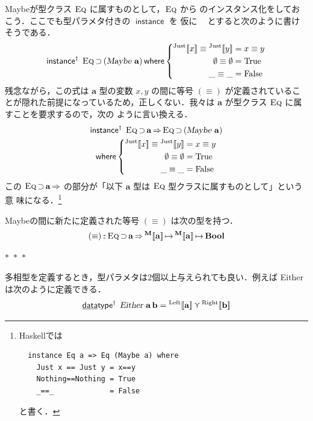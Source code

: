 \documentclass[a5paper,twoside,fleqn,draft]{jsbook}
\def\[{[\![}
\def\]{]\!]}
\newcommand{\separator}{\begin{center}$*$~$*$~$*$\end{center}}
\newcommand{\programminglanguage}[1]{\textsf{#1}}
\newcommand{\haskell}{\programminglanguage{Haskell}}
\newcommand{\mKeyword}[1]{\mathsf{#1}}
\newcommand{\mKeywordUnderline}[1]{\text{\underline{\textsf{#1}}}}
\newcommand{\mDataTypeKeyword}{\mKeywordUnderline{data}\mKeyword{type}}
\newcommand{\mInstanceDeclKeyword}{\mKeyword{instance}}
\newcommand{\mWhereKeyword}{\mKeyword{where}}
\DeclareMathOperator{\mDataTypePolymorphic}{\mDataTypeKeyword^\dagger}
\DeclareMathOperator{\mInstanceDecl}{\mInstanceDeclKeyword}
\DeclareMathOperator{\mInstanceDeclPolymorphic}{\mInstanceDeclKeyword^{\dagger}}
\DeclareMathOperator{\mSuperClass}{\Rightarrow}
\DeclareMathOperator{\mSuperSet}{\supset}
\DeclareMathOperator{\mWhere}{\mWhereKeyword}
\newcommand{\mSpecialConstant}[1]{\textrm{#1}}
\newcommand{\mFalse}{\mSpecialConstant{False}}
\newcommand{\mNothing}{\emptyset}
\newcommand{\mTrue}{\mSpecialConstant{True}}
\DeclareMathOperator{\mFuncArrow}{\mapsto}
\DeclareMathOperator{\mIn}{{:\!:}}
\DeclareMathOperator{\mValueOr}{\curlyvee}
\newcommand{\mType}[1]{\mathbf{#1}} %
\newcommand{\mA}{\mType{a}}
\newcommand{\mB}{\mType{b}}
\newcommand{\mBoolType}{\mType{Bool}}
\newcommand{\mTypeAssemble}[2]{{}^\mType{#1}\[\mType{#2}\]}
\newcommand{\mMaybeType}[1]{\mTypeAssemble{M}{#1}}
\newcommand{\mTypeConstructor}[1]{\textsl{#1}}
\DeclareMathOperator{\mEitherTypeConstructor}{\mTypeConstructor{Either}}
\DeclareMathOperator{\mMaybeTypeConstructor}{\mTypeConstructor{Maybe}}
\newcommand{\mValueConstructor}[1]{\mathrm{#1}}
\newcommand{\mValueWith}[2]{{}^\mValueConstructor{#1}\[#2\]}
\newcommand{\mLeftWith}[1]{\mValueWith{Left}{#1}}
\newcommand{\mRightWith}[1]{\mValueWith{Right}{#1}}
\newcommand{\mJustWith}[1]{\mValueWith{Just}{#1}}
\newcommand{\mTypeClass}[1]{\textsc{#1}} %
\newcommand{\mEqTypeClass}{\mTypeClass{Eq}}
\newcommand{\mProjEXP}[2]{#1\mFuncArrow#2} %
\begin{document}
Maybeが型クラス $\mEqTypeClass$ に属すものとして，$\mEqTypeClass$ から
のインスタンス化をしておこう．ここでも型パラメタ付きの $\mInstanceDecl$ を
仮に $\mInstanceDeclPolymorphic$ とすると次のように書けそうである．
\begin{equation}
  \mInstanceDeclPolymorphic\;
  \mEqTypeClass\mSuperSet{}(\mMaybeTypeConstructor\,\mA)
  \mWhere
  \left\{
  \begin{aligned}
    \mJustWith{x}\equiv\mJustWith{y}
    &=x\equiv y\\
    \mNothing\equiv\mNothing
    &=\mTrue\\
    \_\equiv\_
    &=\mFalse
  \end{aligned}
  \right.
\end{equation}
残念ながら，この式は $\mA $ 型の変数 $x,y$ の間に等号 $(\equiv)$
が定義されていることが隠れた前提になっているため，正しくない．我々は
$\mA $ が型クラス $\mEqTypeClass$ に属すことを要求するので，次の
ように言い換える．
\begin{multline}
\mInstanceDeclPolymorphic\;
\mEqTypeClass\mSuperSet\mA
\mSuperClass
\mEqTypeClass\mSuperSet{}(\mMaybeTypeConstructor\,\mA )\\
\mWhere
\left\{
\begin{aligned}
\mJustWith{x}\equiv\mJustWith{y}&=x\equiv y\\
\mNothing\equiv\mNothing&=\mTrue\\
\_\equiv\_&=\mFalse
\end{aligned}
\right.
\end{multline}
この $\mEqTypeClass\mSuperSet\mA \mSuperClass$ の部分が「以下
$\mA $ 型は $\mEqTypeClass$ 型クラスに属すものとして」という意
味になる．\footnote{\haskell では
\begin{verbatim}
  instance Eq a => Eq (Maybe a) where
    Just x == Just y = x==y
    Nothing==Nothing = True
    _==_             = False
\end{verbatim}
と書く．
}

Maybeの間に新たに定義された等号 $(\equiv)$ は次の型を持つ．
\begin{equation}
(\equiv)
\mIn{}\mEqTypeClass\mSuperSet\mA
\mSuperClass\mProjEXP{\mMaybeType{a}}{\mProjEXP{\mMaybeType{a}}{\mBoolType}}
\end{equation}

\separator

多相型を定義するとき，型パラメタは2個以上与えられても良い．例えば
Eitherは次のように定義できる．
\begin{equation}
\mDataTypePolymorphic\;\mEitherTypeConstructor\,\mA \,\mB
=\mLeftWith{\mA }
\mValueOr
\mRightWith{\mB }
\end{equation}
\end{document}

